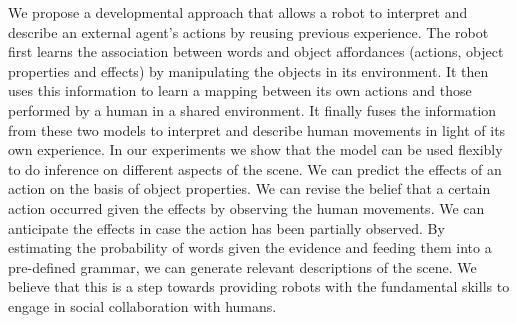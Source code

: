 We propose a developmental approach that allows a robot to interpret and describe an external agent's actions by reusing previous experience.
The robot first learns the association between words and object affordances (actions, object properties and effects) by manipulating the objects in its environment.
It then uses this information to learn a mapping between its own actions and those performed by a human in a shared environment.
It finally fuses the information from these two models to interpret and describe human movements in light of its own experience.
In our experiments we show that the model can be used flexibly to do inference on different aspects of the scene.
We can predict the effects of an action on the basis of object properties.
We can revise the belief that a certain action occurred given the effects by observing the human movements.
We can anticipate the effects in case the action has been partially observed.
By estimating the probability of words given the evidence and feeding them into a pre-defined grammar, we can generate relevant descriptions of the scene.
We believe that this is a step towards providing robots with the fundamental skills to engage in social collaboration with humans.
